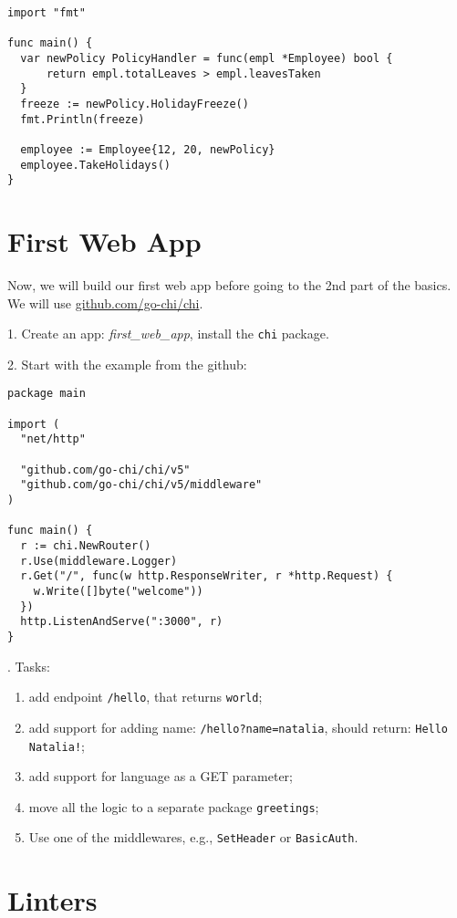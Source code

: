 \documentclass[11pt, letterpaper]{article}
\begin{document}
\begin{verbatim}
import "fmt"

func main() {
  var newPolicy PolicyHandler = func(empl *Employee) bool {
      return empl.totalLeaves > empl.leavesTaken
  }
  freeze := newPolicy.HolidayFreeze()
  fmt.Println(freeze)

  employee := Employee{12, 20, newPolicy}
  employee.TakeHolidays()
}
\end{verbatim}

\section{First Web App}

Now, we will build our first web app before going to the 2nd part of the basics. We will use \href{https://github.com/go-chi/chi}{github.com/go-chi/chi}.

1. Create an app: \emph{first\_web\_app}, install the \verb|chi| package.

\bigskip

2. Start with the example from the github:

\begin{verbatim}
package main

import (
  "net/http"

  "github.com/go-chi/chi/v5"
  "github.com/go-chi/chi/v5/middleware"
)

func main() {
  r := chi.NewRouter()
  r.Use(middleware.Logger)
  r.Get("/", func(w http.ResponseWriter, r *http.Request) {
    w.Write([]byte("welcome"))
  })
  http.ListenAndServe(":3000", r)
}
\end{verbatim}

. Tasks: \begin{enumerate}
\item add endpoint \verb|/hello|, that returns \verb|world|;
\item add support for adding name: \verb|/hello?name=natalia|, should return: \verb|Hello Natalia!|;
\item add support for language as a {\small GET} parameter;
\item move all the logic to a separate package \verb|greetings|;
\item Use one of the middlewares, e.g., \verb|SetHeader| or \verb|BasicAuth|.
\end{enumerate}

\section{Linters}
\end{document}
